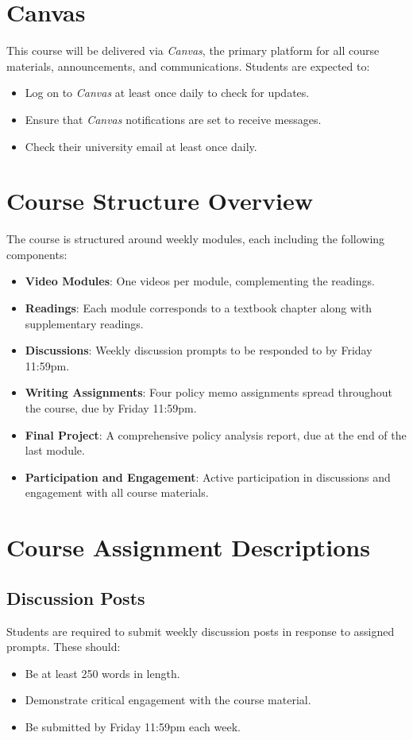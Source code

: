 \documentclass[12pt, letterpaper]{article}
\begin{document}
\section*{Canvas}

This course will be delivered via \emph{Canvas}, the primary platform for all course materials, announcements, and communications. Students are expected to:
\begin{itemize}
    \item Log on to \emph{Canvas} at least once daily to check for updates.
    \item Ensure that \emph{Canvas} notifications are set to receive messages.
    \item Check their university email at least once daily.
\end{itemize}

\section*{Course Structure Overview}

The course is structured around weekly modules, each including the following components:
\begin{itemize}
    \item \textbf{Video Modules}: One videos per module, complementing the readings.
    \item \textbf{Readings}: Each module corresponds to a textbook chapter along with supplementary readings.
    \item \textbf{Discussions}: Weekly discussion prompts to be responded to by Friday 11:59pm.
    \item \textbf{Writing Assignments}: Four policy memo assignments spread throughout the course, due by Friday 11:59pm.
    \item \textbf{Final Project}: A comprehensive policy analysis report, due at the end of the last module.
    \item \textbf{Participation and Engagement}: Active participation in discussions and engagement with all course materials.
\end{itemize}

\section*{Course Assignment Descriptions}

\subsection*{Discussion Posts}
Students are required to submit weekly discussion posts in response to assigned prompts. These should:
\begin{itemize}
    \item Be at least 250 words in length.
    \item Demonstrate critical engagement with the course material.
    \item Be submitted by Friday 11:59pm each week.
\end{itemize}
\end{document}
